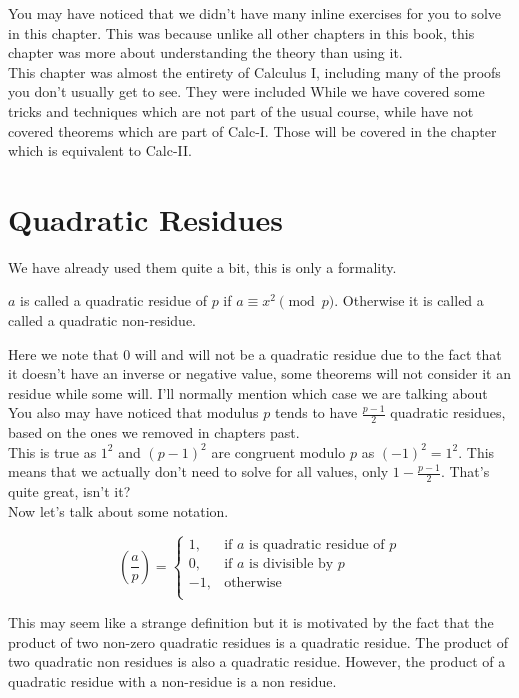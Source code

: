 You may have noticed that we didn't have many inline exercises for you to solve in this chapter. This was because unlike all other chapters in this book, this chapter was more about understanding the theory than using it. \\
This chapter was almost the entirety of Calculus I, including many of the proofs you don't usually get to see.  They were included 
While we have covered some tricks and techniques which are not part of the usual course, while have not covered theorems which are part of Calc-I. Those will be covered in the chapter which is equivalent to Calc-II. 

\section{Quadratic Residues}
We have already used them quite a bit, this is only a formality.\\
\begin{definition}
    $a$ is called a quadratic residue of $p$ if $a \equiv x^2 \pmod{p}$. Otherwise it is called a called a quadratic non-residue.
\end{definition}
Here we note that $0$ will and will not be a quadratic residue due to the fact that it doesn't have an inverse or negative value, some theorems will not consider it an residue while some will. I'll normally mention which case we are talking about\\
You also may have noticed that modulus $p$ tends to have $\frac{p-1}{2}$ quadratic residues, based on the ones we removed in chapters past.\\
This is true as $1^2$ and $(p-1)^2$ are congruent modulo $p$ as $(-1)^2=1^2$. This means that we actually don't need to solve for all values, only $1-\frac{p-1}{2}$. That's quite great, isn't it?\\
Now let's talk about some notation.\\
\begin{definition}
    \[(\frac{a}{p}) = \begin{cases}
    1, & \text{if } a \text{ is quadratic residue of } p\\
    0, & \text{if } a \text{ is divisible by } p\\ 
    -1, & \text{otherwise}\\ 
    \end{cases}\]
\end{definition}
This may seem like a strange definition but it is motivated by the fact that the product of two non-zero quadratic residues is a quadratic residue. The product of two quadratic non residues is also a quadratic residue. However, the product of a quadratic residue with a non-residue is a non residue.\\
